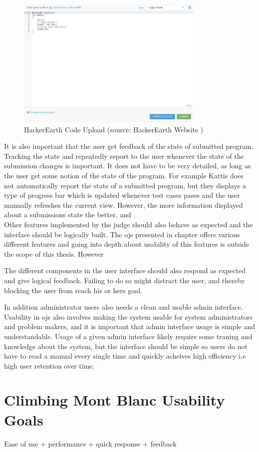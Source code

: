 \begin{figure}
    \centering
    \includegraphics[width=0.8\textwidth]{figs/hackerearth_upload.jpg}
    \caption[HackerEarth Code Upload]{HackerEarth Code Upload (source: HackerEarth Website \cite{HACKEREARTH})}
    \label{fig:hackerearth-upload}
\end{figure}

It is also important that the user get feedback of the state of submitted program. Tracking the state and repeatedly report to the user whenever the state of the submission changes is important. It does not have to be very detailed, as long as the user get some notion of the state of the program. For example Kattis does not automatically report the state of a submitted program, but they displays a type of progress bar which is updated whenever test cases pases and the user manually refreshes the current view. However, the more information displayed about a submissions state the better, and . \\

Other features implemented by the judge should also behave as expected and the interface should be logically built. The \glspl{oj} presented in chapter offers various different features and going into depth about usability of this features is outside the scope of this thesis. However

The different components in the user interface should also respond as expected and give logical feedback. Failing to do so might distract the user, and thereby blocking the user from reach his or hers goal.

In addition administrator users also needs a clean and usable admin interface. Usability in \glspl{oj} also involves making the system usable for system administrators and problem makers, and it is important that admin interface usage is simple and understandable. Usage of a given admin interface likely require some traning and knowledge about the system, but the interface should be simple so users do not have to read a manual every single time and quickly acheives high efficiency i.e high user retention over time.

\section{Climbing Mont Blanc Usability Goals}
\label{sec:cmb-usability}
Ease of use + performance + quick response + feedback
